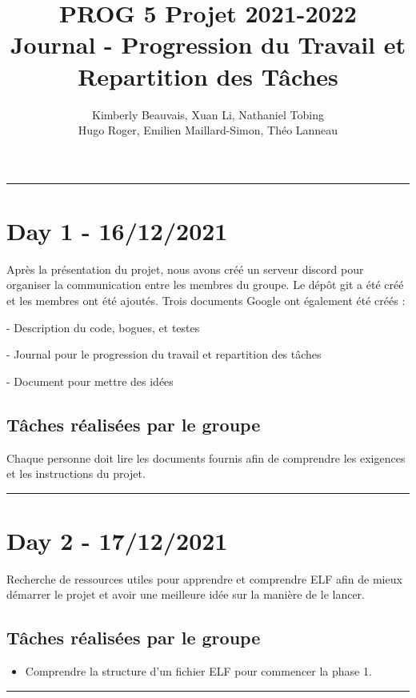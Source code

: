 \documentclass[11pt,letterpaper]{article}
\title{PROG 5 Projet 2021-2022 \\
\large Journal - Progression du Travail et Repartition des Tâches}
\author{Kimberly Beauvais, Xuan Li, Nathaniel Tobing \\
Hugo Roger, Emilien Maillard-Simon, Théo Lanneau}
\date{}
\begin{document}
\maketitle

\noindent\rule{13cm}{0.4pt}

\section*{Day 1 - 16/12/2021}

Après la présentation du projet, nous avons créé un serveur discord pour organiser 
la communication entre les membres du groupe. Le dépôt git a été créé et les membres 
ont été ajoutés. Trois documents Google ont également été créés :

\indent - Description du code, bogues, et testes

\indent - Journal pour le progression du travail et repartition des tâches

\indent - Document pour mettre des idées

\subsection*{Tâches réalisées par le groupe}
Chaque personne doit lire les documents fournis afin de comprendre les exigences et 
les instructions du projet. 

\noindent\rule{13cm}{0.4pt}

\section*{Day 2 - 17/12/2021}
Recherche de ressources utiles pour apprendre et comprendre ELF afin de mieux 
démarrer le projet et avoir une meilleure idée sur la manière de le lancer.

\subsection*{Tâches réalisées par le groupe}
\begin{itemize}
    \item Comprendre la structure d'un fichier ELF pour commencer la phase 1.
\end{itemize}

\noindent\rule{13cm}{0.4pt}

\end{document}
